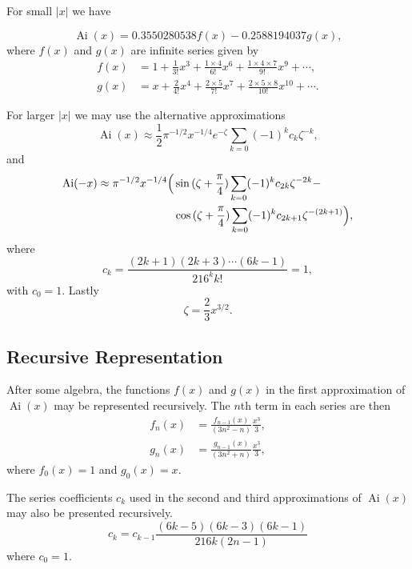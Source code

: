\documentclass[]{article}
\renewcommand{\mod}[1]{\ensuremath{\lvert {#1} \rvert}}
\newcommand{\Ai}[1]{\ensuremath{\operatorname{Ai}({#1})}}
\begin{document}
For small $\mod{x}$ we have

\[\Ai{x} = 0.3550280538f(x) - 0.2588194037g(x),\]
where $f(x)$ and $g(x)$ are infinite series given by
\begin{align}
f(x) &= 1 + \frac{1}{3!}x^{3} + \frac{1\times4}{6!}x^{6} + \frac{1\times4\times{7}}{9!}x^{9} + \dotsb,\label{eqn:airyfirstf}\\
g(x) &= x + \frac{2}{4!}x^{4} + \frac{2\times5}{7!}x^{7} + \frac{2\times5\times{8}}{10!}x^{10} + \dotsb\label{eqn:airyfirstg}.
\end{align}

For larger $\mod{x}$ we may use the alternative approximations
\[
\Ai{x} \approx \frac{1}{2}\pi^{-1/2}x^{-1/4}e^{-\zeta} \sum\limits_{k=0} (-1)^{k}c_{k}\zeta^{-k},
\]
and
\[
	\begin{split}
		\Ai{-x} \approx \pi^{-1/2}x^{-1/4}
		\Bigl(
			&\sin{(\zeta + \frac{\pi}{4})}\sum\limits_{k=0}(-1)^{k}c_{2k}\zeta^{-2k} -\\
			&\cos{(\zeta + \frac{\pi}{4})}\sum\limits_{k=0}(-1)^{k}c_{2k+1}\zeta^{-(2k+1)}
		\Bigr),
	\end{split}
\]
where
\begin{equation}\label{eqn:ck}
c_{k} = \frac{(2k+1)(2k+3)\dotsb(6k-1)}{216^{k}k!} = 1,
\end{equation}
with $c_{0} = 1$. Lastly
\[
\zeta = \frac{2}{3}x^{3/2}.
\]

\subsection{Recursive Representation}\label{app:recursion}

After some algebra, the functions $f(x)$ and $g(x)$ in the first approximation of $\Ai{x}$ may be represented recursively. The $n$th term in each series are then
\begin{align*}
f_{n}(x) &= \frac{f_{n-1}(x)}{(3n^{2} - n)} \frac{x^{3}}{3},\\ 
g_{n}(x) &= \frac{g_{n-1}(x)}{(3n^{2} + n)} \frac{x^{3}}{3},
\end{align*}
where $f_{0}(x) = 1$ and $g_{0}(x) = x$.

The series coefficients $c_{k}$ used in the second and third approximations of $\Ai{x}$ may also be presented recursively.
\[
c_{k} = c_{k-1} \frac{(6k-5)(6k-3)(6k-1)}{216k(2n-1)}
\]
where $c_{0} = 1$.



\end{document}
